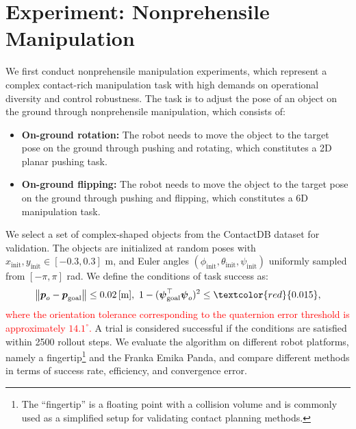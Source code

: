 \section{Experiment: Nonprehensile Manipulation}
\label{sec:experiment}

 We first conduct nonprehensile manipulation experiments, which represent a complex contact-rich manipulation task with high demands on operational diversity and control robustness. The task is to adjust the pose of an object on the ground through nonprehensile manipulation, which consists of:
\begin{itemize}
    \item \textbf{On-ground rotation:} The robot needs to move the object to the target pose on the ground through pushing and rotating, which constitutes a 2D planar pushing task.
    \item \textbf{On-ground flipping:} The robot needs to move the object to the target pose on the ground through pushing and flipping, which constitutes a 6D manipulation task.
\end{itemize}
We select a set of complex-shaped objects from the ContactDB dataset \cite{brahmbhatt2019contactdb} for validation. The objects are initialized at random poses with 
$x_{\text{init}}, y_{\text{init}} \in [-0.3, 0.3]$ m, 
and Euler angles $(\phi_{\text{init}}, \theta_{\text{init}} , \psi_{\text{init}})$ 
uniformly sampled from $[-\pi, \pi]$ rad. We define the conditions of task success as: 
\begin{equation}
    \left\| \boldsymbol{p}_o - \boldsymbol{p}_{\text{goal}} \right\|
\le 0.02 \,\text{[m]}, \ 
1 - (\boldsymbol{\psi}_{\text{goal}}^\top \boldsymbol{\psi}_o)^2
\le \textcolor{red}{0.015}, \label{eq:pose_success}
\end{equation}
\textcolor{red}{where the orientation tolerance corresponding to the quaternion error threshold is approximately $14.1^\circ$.} A trial is considered successful if the conditions are satisfied within 2500 rollout steps. We evaluate the algorithm on different robot platforms, namely a fingertip\footnote{The ``fingertip'' is a floating point with a collision volume and is commonly used as a simplified setup for validating contact planning methods.} and the Franka Emika Panda, and compare different methods in terms of success rate, efficiency, and convergence error.  

